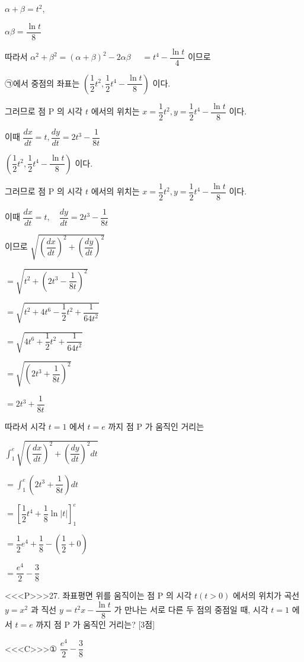 \documentclass{oblivoir}
\begin{document}
$\alpha+\beta=t^{2}$,

$\alpha \beta=\dfrac{\ln t}{8}$

따라서 $\alpha^{2}+\beta^{2}=(\alpha+\beta)^{2}-2 \alpha \beta$ $\quad=t^{4}-\dfrac{\ln t}{4}$ 이므로 

㉠에서 중점의 좌표는 $\left(\dfrac{1}{2} t^{2}, \dfrac{1}{2} t^{4}-\dfrac{\ln t}{8}\right)$ 이다. 

그러므로 점 $\mathrm{P}$ 의 시각 $t$ 에서의 위치는 $x=\dfrac{1}{2} t^{2}, y=\dfrac{1}{2} t^{4}-\dfrac{\ln t}{8}$ 이다.

이때 $\dfrac{d x}{d t}=t, \dfrac{d y}{d t}=2 t^{3}-\dfrac{1}{8 t}$

$\left(\dfrac{1}{2} t^{2}, \dfrac{1}{2} t^{4}-\dfrac{\ln t}{8}\right)$ 이다.

그러므로 점 $\mathrm{P}$ 의 시각 $t$ 에서의 위치는
$x=\dfrac{1}{2} t^{2}, y=\dfrac{1}{2} t^{4}-\dfrac{\ln t}{8}$
이다.

이때
$\dfrac{d x}{d t}=t, \quad \dfrac{d y}{d t}=2 t^{3}-\dfrac{1}{8 t}$

이므로
$\sqrt{\left(\dfrac{d x}{d t}\right)^{2}+\left(\dfrac{d y}{d t}\right)^{2}}$

$=\sqrt{t^{2}+\left(2 t^{3}-\dfrac{1}{8 t}\right)^{2}}$

$=\sqrt{t^{2}+4 t^{6}-\dfrac{1}{2} t^{2}+\dfrac{1}{64 t^{2}}}$

$=\sqrt{4 t^{6}+\dfrac{1}{2} t^{2}+\dfrac{1}{64 t^{2}}}$

$=\sqrt{\left(2 t^{3}+\dfrac{1}{8 t}\right)^{2}}$

$=2 t^{3}+\dfrac{1}{8 t}$

따라서 시각 $t=1$ 에서 $t=e$ 까지 점 $\mathrm{P}$ 가 움직인 거리는

$\displaystyle\int_{1}^{e} \sqrt{\left(\dfrac{d x}{d t}\right)^{2}+\left(\dfrac{d y}{d t}\right)^{2} d t}$

$=\displaystyle\int_{1}^{e}\left(2 t^{3}+\dfrac{1}{8 t}\right) d t$

$=\left[\dfrac{1}{2} t^{4}+\dfrac{1}{8} \ln |t|\right]_{1}^{e}$

$=\dfrac{1}{2} e^{4}+\dfrac{1}{8}-\left(\dfrac{1}{2}+0\right)$

$=\dfrac{e^{4}}{2}-\dfrac{3}{8}$


<<<P>>>27. 좌표평면 위를 움직이는 점 $\mathrm{P}$ 의 시각 $t(t>0)$ 에서의 위치가 곡선 $y=x^{2}$ 과 직선 $y=t^{2} x-\dfrac{\ln t}{8}$ 가 만나는 서로 다른 두 점의 중점일 때, 시각 $t=1$ 에서 $t=e$ 까지 점 $\mathrm{P}$ 가 움직인 거리는? [3점]

<<<C>>>① $\dfrac{e^{4}}{2}-\dfrac{3}{8}$
\end{document}
